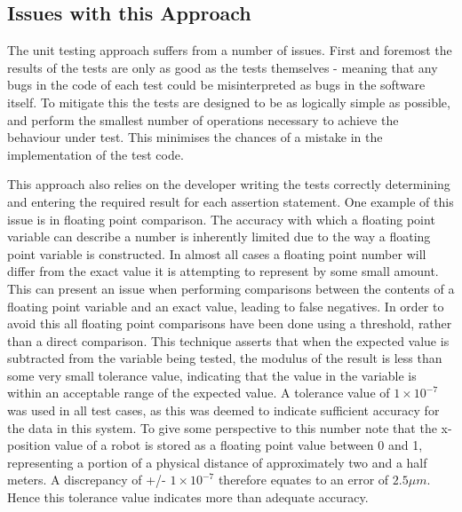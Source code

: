\subsection{Issues with this Approach}
The unit testing approach suffers from a number of issues. First and foremost the results of the tests are only as good as the tests themselves - meaning that any bugs in the code of each test could be misinterpreted as bugs in the software itself. To mitigate this the tests are designed to be as logically simple as possible, and perform the smallest number of operations necessary to achieve the behaviour under test. This minimises the chances of a mistake in the implementation of the test code. 

This approach also relies on the developer writing the tests correctly determining and entering the required result for each assertion statement. One example of this issue is in floating point comparison. The accuracy with which a floating point variable can describe a number is inherently limited due to the way a floating point variable is constructed. In almost all cases a floating point number will differ from the exact value it is attempting to represent by some small amount. This can present an issue when performing comparisons between the contents of a floating point variable and an exact value, leading to false negatives. In order to avoid this all floating point comparisons have been done using a threshold, rather than a direct comparison. This technique asserts that when the expected value is subtracted from the variable being tested, the modulus of the result is less than some very small tolerance value, indicating that the value in the variable is within an acceptable range of the expected value. A tolerance value of $ 1 \times 10^{-7} $ was used in all test cases, as this was deemed to indicate sufficient accuracy for the data in this system. To give some perspective to this number note that the x-position value of a robot is stored as a floating point value between 0 and 1, representing a portion of a physical distance of approximately two and a half meters. A discrepancy of +/- $  1 \times 10^{-7} $ therefore equates to an error of $ 2.5 \mu m $. Hence this tolerance value indicates more than adequate accuracy.


